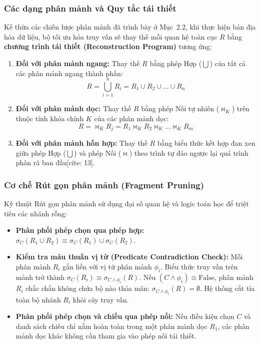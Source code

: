 \documentclass[12pt,a4paper]{report}
\begin{document}
\subsubsection{Các dạng phân mảnh và Quy tắc tái thiết}
Kế thừa các chiến lược phân mảnh đã trình bày ở Mục~2.2, khi thực hiện bản địa hóa dữ liệu, bộ tối ưu hóa truy vấn sẽ thay thế mỗi quan hệ toàn cục $R$ bằng \textbf{chương trình tái thiết (Reconstruction Program)} tương ứng:
\begin{enumerate}[leftmargin=0.8cm, topsep=2pt, itemsep=3pt]
    \item \textbf{Đối với phân mảnh ngang:} Thay thế $R$ bằng phép Hợp ($\bigcup$) của tất cả các phân mảnh ngang thành phần:
    \[
    R = \bigcup_{i=1}^n R_i = R_1 \cup R_2 \cup \dots \cup R_n
    \]
    
    \item \textbf{Đối với phân mảnh dọc:} Thay thế $R$ bằng phép Nối tự nhiên ($\bowtie_K$) trên thuộc tính khóa chính $K$ của các phân mảnh dọc:
    \[
    R = \bowtie_{K} R_j = R_1 \bowtie_K R_2 \bowtie_K \dots \bowtie_K R_m
    \]
    
    \item \textbf{Đối với phân mảnh hỗn hợp:} Thay thế $R$ bằng biểu thức kết hợp đan xen giữa phép Hợp ($\bigcup$) và phép Nối ($\bowtie$) theo trình tự đảo ngược lại quá trình phân rã ban đầu[cite: 13].
\end{enumerate}

\subsubsection{Cơ chế Rút gọn phân mảnh (Fragment Pruning)}
Kỹ thuật Rút gọn phân mảnh sử dụng đại số quan hệ và logic toán học để triệt tiêu các nhánh rỗng:
\begin{itemize}[leftmargin=0.8cm, topsep=1pt, itemsep=1pt]
    \item \textbf{Phân phối phép chọn qua phép hợp:} $\sigma_C (R_1 \cup R_2) \equiv \sigma_C (R_1) \cup \sigma_C (R_2)$.
    \item \textbf{Kiểm tra mâu thuẫn vị từ (Predicate Contradiction Check):} Mỗi phân mảnh $R_i$ gắn liền với vị từ phân mảnh $\phi_i$. Biểu thức truy vấn trên mảnh trở thành $\sigma_C(R_i) \equiv \sigma_{C \wedge \phi_i}(R)$. Nếu $(C \wedge \phi_i) \equiv \text{False}$, phân mảnh $R_i$ chắc chắn không chứa bộ nào thỏa mãn: $\sigma_{C \wedge \phi_i}(R) = \emptyset$. Hệ thống cắt tỉa toàn bộ nhánh $R_i$ khỏi cây truy vấn.
    \item \textbf{Phân phối phép chọn và chiếu qua phép nối:} Nếu điều kiện chọn $C$ và danh sách chiếu chỉ nằm hoàn toàn trong một phân mảnh dọc $R_1$, các phân mảnh dọc khác không cần tham gia vào phép nối tái thiết.
\end{itemize}
\end{document}
